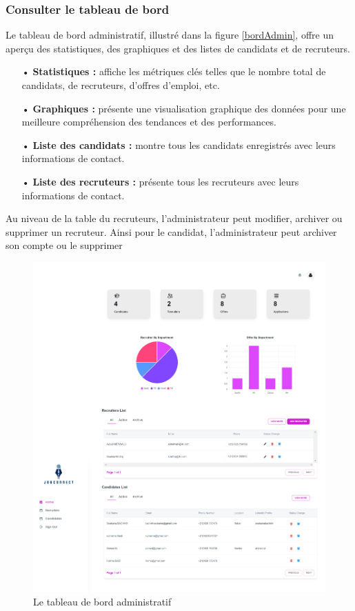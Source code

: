 \subsubsection{Consulter le tableau de bord}

Le tableau de bord administratif, illustré dans la figure \ref{bordAdmin}, offre un aperçu des statistiques, des graphiques et des listes de candidats et de recruteurs.

\begin{itemize}
    \item[•] \textbf{Statistiques :} affiche les métriques clés telles que le nombre total de candidats, de recruteurs, d'offres d'emploi, etc.
    \item[•] \textbf{Graphiques :} présente une visualisation graphique des données pour une meilleure compréhension des tendances et des performances.
    \item[•] \textbf{Liste des candidats :} montre tous les candidats enregistrés avec leurs informations de contact.
    \item[•] \textbf{Liste des recruteurs :} présente tous les recruteurs avec leurs informations de contact.
\end{itemize}

Au niveau de la table du recruteurs, l'administrateur peut modifier, archiver ou supprimer un recruteur. Ainsi pour le candidat, l'administrateur peut archiver son compte ou le supprimer
\begin{figure}[htbp]
   \centering
   \includegraphics[scale=0.2]{screens/dashAdmin.png} 
   \caption{Le tableau de bord administratif}
   \label{fig:bordAdmin}
\end{figure}




